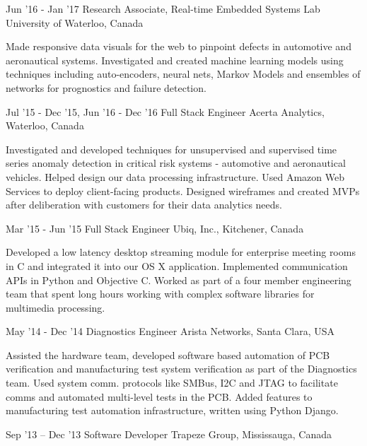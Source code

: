 \documentclass{tccv}
\begin{document}
\begin{eventlist}

\item {Jun '16 - Jan '17}
  {Research Associate, Real-time Embedded Systems Lab}
  {University of Waterloo, Canada}

  Made responsive data visuals for the web to pinpoint defects in automotive and
  aeronautical systems. Investigated and created machine learning models using
  techniques including auto-encoders, neural nets, Markov Models and ensembles
  of networks for prognostics and failure detection.

\item{Jul '15 - Dec '15, Jun '16 - Dec '16}
  {Full Stack Engineer}
  {Acerta Analytics, Waterloo, Canada}

  Investigated and developed techniques for unsupervised and supervised time
  series anomaly detection in critical risk systems - automotive and
  aeronautical vehicles. Helped design our data processing infrastructure. Used
  Amazon Web Services to deploy client-facing products. Designed wireframes and
  created MVPs after deliberation with customers for their data analytics needs.

\item{Mar '15 - Jun '15}
  {Full Stack Engineer}
  {Ubiq, Inc., Kitchener, Canada}

  Developed a low latency desktop streaming module for enterprise meeting rooms
  in C and integrated it into our OS X application. Implemented communication
  APIs in Python and Objective C. Worked as part of a four member engineering
  team that spent long hours working with complex software libraries for
  multimedia processing.

\item{May '14 - Dec '14}
  {Diagnostics Engineer}
  {Arista Networks, Santa Clara, USA}

  Assisted the hardware team, developed software based automation of PCB
  verification and manufacturing test system verification as part of the
  Diagnostics team. Used system comm. protocols like SMBus, I2C and JTAG to
  facilitate comms and automated multi-level tests in the PCB. Added features to
  manufacturing test automation infrastructure, written using Python Django.

\item{Sep '13 -- Dec '13}
  {Software Developer}
  {Trapeze Group, Mississauga, Canada}




\end{eventlist}
\end{document}
